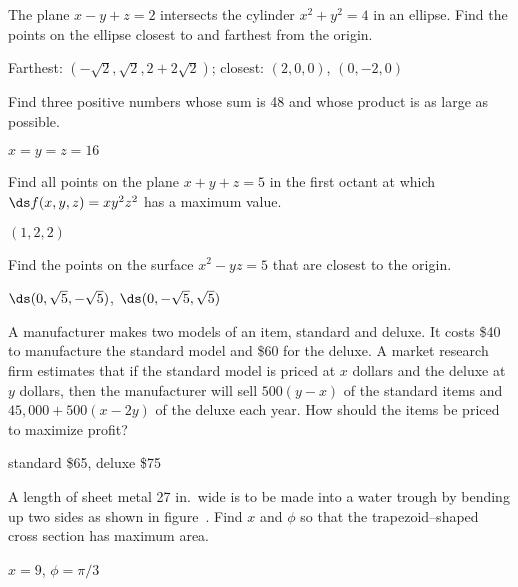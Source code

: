 \begin{exercises}
\begin{exercise} The plane $x-y+z=2$ intersects the cylinder $x^2+y^2=4$ in an
ellipse. Find the points on the ellipse closest to and farthest from
the origin.
\begin{answer} Farthest: $(-\sqrt2,\sqrt2,2+2\sqrt2)$; closest:
$(2,0,0)$, $(0,-2,0)$
\end{answer}\end{exercise}


\begin{exercise} Find three positive numbers whose sum is 48 and whose
product is as large as possible.
\begin{answer} $x=y=z=16$
\end{answer}\end{exercise}

\begin{exercise} Find all points on the plane $x+y+z = 5$ in the first octant at
which $\ds f(x,y,z) = xy^2z^2$ has a maximum value.
\begin{answer} $(1,2,2)$
\end{answer}\end{exercise}

\begin{exercise} Find the points on the surface $x^2 -yz = 5$ that are closest to the
origin.
\begin{answer} $\ds (0,\sqrt{5},-\sqrt{5})$, $\ds (0,-\sqrt{5},\sqrt{5})$
\end{answer}\end{exercise}

\begin{exercise} A manufacturer makes two models of an item, standard and deluxe.  It
costs \$40 to manufacture the standard model and \$60 for the deluxe.  A
market research firm estimates that if the standard model is priced at $x$
dollars and the deluxe at $y$ dollars, then the manufacturer will sell
$500(y-x)$ of the standard items and $45,000+500(x-2y)$ of the deluxe each
year.  How should the items be priced to maximize profit?
\begin{answer} standard \$65, deluxe \$75
\end{answer}\end{exercise}

\begin{exercise} A length of sheet metal 27 in.\ wide is to be made into a
water trough by bending up two sides as shown in
figure~.  Find $x$ and $\phi$ so that the
trapezoid--shaped cross section has maximum area.
\begin{answer} $x=9$, $\phi=\pi/3$
\end{answer}\end{exercise}


\end{exercises}
